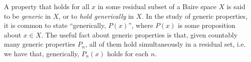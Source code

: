 \documentclass[12pt]{article}
\begin{document}
A property that holds for all $x$ in some residual subset of a Baire space $X$ is said to be \emph{generic} in $X$, or to \emph{hold generically} in $X$. In the study of generic properties, it is common to state ``generically, $P(x)$'', where $P(x)$ is some proposition about $x\in X$. The useful fact about generic properties is that, given countably many generic properties $P_n$, all of them hold simultaneously in a residual set, i.e. we have that, generically, $P_n(x)$ holds for each $n$.
\end{document}
